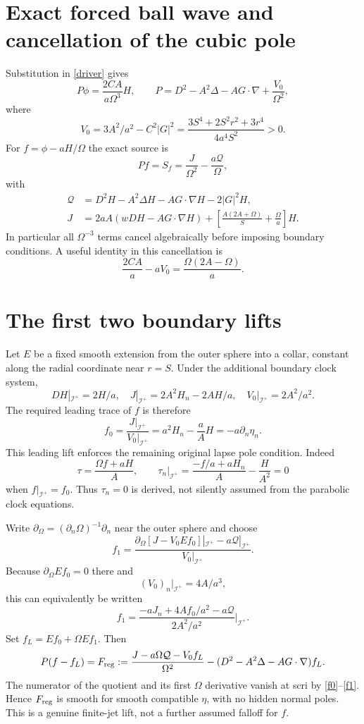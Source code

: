 \documentclass[11pt]{article}
\newcommand{\scri}{\mathscr I^+}
\begin{document}
\section{Exact forced ball wave and cancellation of the cubic pole}
Substitution in \eqref{driver} gives
\begin{equation}
 P\phi=\frac{2CA}{a\Omega^3}H,\qquad
 P=D^2-A^2\Delta-AG\cdot\nabla+\frac{V_0}{\Omega^2},\label{Pphi}
\end{equation}
where
\[
 V_0=3A^2/a^2-C^2|G|^2
 =\frac{3S^4+2S^2r^2+3r^4}{4a^4S^2}>0.
\]
For $f=\phi-aH/\Omega$ the exact source is
\begin{equation}
 Pf=S_f=\frac{J}{\Omega^2}-\frac{a\mathcal Q}{\Omega},\label{Sf}
\end{equation}
with
\begin{align}
 \mathcal Q&=D^2H-A^2\Delta H-AG\cdot\nabla H-2|G|^2H,\\
 J&=2aA(wDH-AG\cdot\nabla H)
 +\left[\frac{A(2A+\Omega)}S+\frac\Omega a\right]H.
\end{align}
In particular all $\Omega^{-3}$ terms cancel algebraically before imposing boundary conditions. A useful identity in this cancellation is
\[
 \frac{2CA}{a}-aV_0=\frac{\Omega(2A-\Omega)}a.
\]

\section{The first two boundary lifts}
Let $E$ be a fixed smooth extension from the outer sphere into a collar, constant along the radial coordinate near $r=S$. Under the additional boundary clock system,
\[
 DH|_{\scri}=2H/a,\quad
 J|_{\scri}=2A^2H_n-2AH/a,\quad
 V_0|_{\scri}=2A^2/a^2.
\]
The required leading trace of $f$ is therefore
\begin{equation}
 f_0=\frac{J|_{\scri}}{V_0|_{\scri}}
 =a^2H_n-\frac aA H=-a\partial_n\eta_n.\label{f0}
\end{equation}
This leading lift enforces the remaining original lapse pole condition. Indeed
\[
 \tau=\frac{\Omega f+aH}{A},\qquad
 \tau_n|_{\scri}=\frac{-f/a+aH_n}{A}-\frac H{A^2}=0
\]
when $f|_{\scri}=f_0$. Thus $\tau_n=0$ is derived, not silently assumed from the parabolic clock equations.

Write $\partial_\Omega=(\partial_n\Omega)^{-1}\partial_n$ near the outer sphere and choose
\begin{equation}
 f_1=\frac{\partial_\Omega[J-V_0E f_0]|_{\scri}-a\mathcal Q|_{\scri}}
 {V_0|_{\scri}}.\label{f1}
\end{equation}
Because $\partial_\Omega E f_0=0$ there and
\[
 (V_0)_n|_{\scri}=4A/a^3,
\]
this can equivalently be written
\[
 f_1=\frac{-aJ_n+4Af_0/a^2-a\mathcal Q}{2A^2/a^2}\bigg|_{\scri}.
\]
Set $f_L=E f_0+\Omega E f_1$. Then
\begin{equation}
 P(f-f_L)=F_{\rm reg}:=
 \frac{J-a\Omega\mathcal Q-V_0 f_L}{\Omega^2}
 -(D^2-A^2\Delta-AG\cdot\nabla)f_L.\label{Freg}
\end{equation}
The numerator of the quotient and its first $\Omega$ derivative vanish at scri by \eqref{f0}--\eqref{f1}. Hence $F_{\rm reg}$ is smooth for smooth compatible $\eta$, with no hidden normal poles. This is a genuine finite-jet lift, not a further assumed falloff for $f$.
\end{document}
